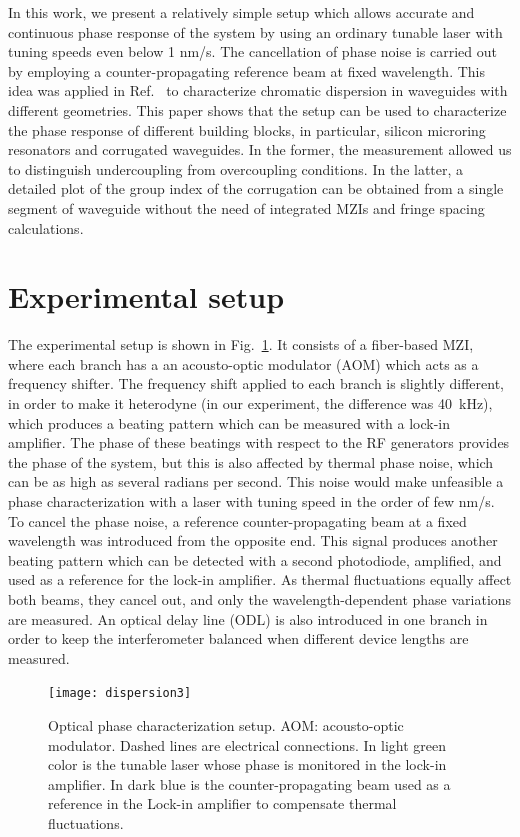 \documentclass[journal]{IEEEtran}
\begin{document}
In this work, we present a relatively simple setup which allows accurate and continuous phase response of the system by using an ordinary tunable laser with tuning speeds even below 1 nm/s.
The cancellation of phase noise is carried out by employing a counter-propagating reference beam at fixed wavelength.
This idea was applied in Ref.~\cite{Mas2012} to characterize chromatic dispersion in waveguides with different geometries.
This paper shows that the setup can be used to characterize the phase response of different building blocks, in particular, silicon microring resonators and corrugated waveguides.
In the former, the measurement allowed us to distinguish undercoupling from overcoupling conditions.
In the latter, a detailed plot of the group index of the corrugation can be obtained from a single segment of waveguide without the need of integrated MZIs and fringe spacing calculations.


\section{Experimental setup}
The experimental setup is shown in Fig.~\ref{fig:dispersionSetup}.
It consists of a fiber-based MZI, where each branch has a an acousto-optic modulator (AOM) which acts as a frequency shifter.
The frequency shift applied to each branch is slightly different, in order to make it heterodyne (in our experiment, the difference was 40~kHz), which produces a beating pattern which can be measured with a lock-in amplifier.
The phase of these beatings with respect to the RF generators provides the phase of the system, but this is also affected by thermal phase noise, which can be as high as several radians per second.
This noise would make unfeasible a phase characterization with a laser with tuning speed in the order of few nm/s. To cancel the phase noise, a reference counter-propagating beam at a fixed wavelength was introduced from the opposite end.
This signal produces another beating pattern which can be detected with a second photodiode, amplified, and used as a reference for the lock-in amplifier.
As thermal fluctuations equally affect both beams, they cancel out, and only the wavelength-dependent phase variations are measured.
An optical delay line (ODL) is also introduced in one branch in order to keep the interferometer balanced when different device lengths are measured. 


\begin{figure}[htb]
	\centering
	\texttt{[image: dispersion3]}
	\caption{Optical phase characterization setup. AOM: acousto-optic modulator. Dashed lines are electrical connections. In light green color is the tunable laser whose phase is monitored in the lock-in amplifier. In dark blue is the counter-propagating beam used as a reference in the Lock-in amplifier to compensate thermal fluctuations.}
	\label{fig:dispersionSetup}
\end{figure}
\end{document}
